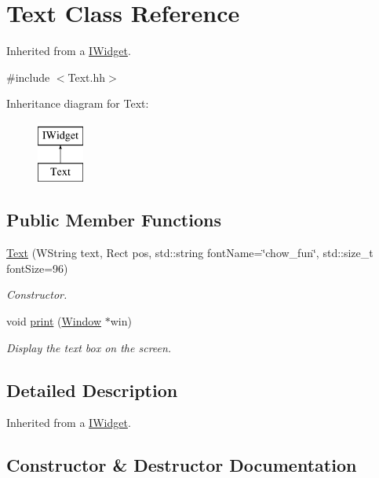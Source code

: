 \hypertarget{classText}{}\section{Text Class Reference}
\label{classText}


Inherited from a \hyperlink{classIWidget}{I\+Widget}.  




{\ttfamily \#include $<$Text.\+hh$>$}

Inheritance diagram for Text\+:\begin{figure}[H]
\begin{center}
\leavevmode
\includegraphics[height=2.000000cm]{classText}
\end{center}
\end{figure}
\subsection*{Public Member Functions}
\begin{DoxyCompactItemize}
\item 
\hyperlink{classText_a00ba9f4a2c3ca172e17433d2ceda4d55}{Text} (W\+String text, Rect pos, std\+::string font\+Name=\char`\"{}chow\+\_\+fun\char`\"{}, std\+::size\+\_\+t font\+Size=96)
\begin{DoxyCompactList}\small\item\em Constructor. \end{DoxyCompactList}\item 
void \hyperlink{classText_a811c378e24edd0a661cbc0e77ae4e785}{print} (\hyperlink{classWindow}{Window} $\ast$win)
\begin{DoxyCompactList}\small\item\em Display the text box on the screen. \end{DoxyCompactList}\end{DoxyCompactItemize}


\subsection{Detailed Description}
Inherited from a \hyperlink{classIWidget}{I\+Widget}. 

\subsection{Constructor \& Destructor Documentation}
\mbox{\label{classText_a00ba9f4a2c3ca172e17433d2ceda4d55}} 
